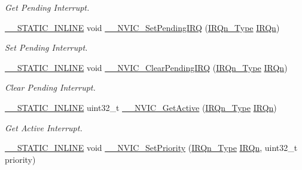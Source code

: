 \begin{DoxyCompactItemize}
\begin{DoxyCompactList}\small\item\em Get Pending Interrupt. \end{DoxyCompactList}\item 
\mbox{\hyperlink{cmsis__iccarm_8h_aba87361bfad2ae52cfe2f40c1a1dbf9c}{\+\_\+\+\_\+\+S\+T\+A\+T\+I\+C\+\_\+\+I\+N\+L\+I\+NE}} void \mbox{\hyperlink{group___c_m_s_i_s___core___n_v_i_c_functions_gaabefdd4b790b9a7308929938c0c1e1ad}{\+\_\+\+\_\+\+N\+V\+I\+C\+\_\+\+Set\+Pending\+I\+RQ}} (\mbox{\hyperlink{group___interrupt__vector__numbers_gac3af4a32370fb28c4ade8bf2add80251}{I\+R\+Qn\+\_\+\+Type}} \mbox{\hyperlink{group___interrupt__vector__numbers_ga666eb0caeb12ec0e281415592ae89083}{I\+R\+Qn}})
\begin{DoxyCompactList}\small\item\em Set Pending Interrupt. \end{DoxyCompactList}\item 
\mbox{\hyperlink{cmsis__iccarm_8h_aba87361bfad2ae52cfe2f40c1a1dbf9c}{\+\_\+\+\_\+\+S\+T\+A\+T\+I\+C\+\_\+\+I\+N\+L\+I\+NE}} void \mbox{\hyperlink{group___c_m_s_i_s___core___n_v_i_c_functions_ga562a86dbdf14827d0fee8fdafb04d191}{\+\_\+\+\_\+\+N\+V\+I\+C\+\_\+\+Clear\+Pending\+I\+RQ}} (\mbox{\hyperlink{group___interrupt__vector__numbers_gac3af4a32370fb28c4ade8bf2add80251}{I\+R\+Qn\+\_\+\+Type}} \mbox{\hyperlink{group___interrupt__vector__numbers_ga666eb0caeb12ec0e281415592ae89083}{I\+R\+Qn}})
\begin{DoxyCompactList}\small\item\em Clear Pending Interrupt. \end{DoxyCompactList}\item 
\mbox{\hyperlink{cmsis__iccarm_8h_aba87361bfad2ae52cfe2f40c1a1dbf9c}{\+\_\+\+\_\+\+S\+T\+A\+T\+I\+C\+\_\+\+I\+N\+L\+I\+NE}} uint32\+\_\+t \mbox{\hyperlink{group___c_m_s_i_s___core___n_v_i_c_functions_gaa2837003c28c45abf193fe5e8d27f593}{\+\_\+\+\_\+\+N\+V\+I\+C\+\_\+\+Get\+Active}} (\mbox{\hyperlink{group___interrupt__vector__numbers_gac3af4a32370fb28c4ade8bf2add80251}{I\+R\+Qn\+\_\+\+Type}} \mbox{\hyperlink{group___interrupt__vector__numbers_ga666eb0caeb12ec0e281415592ae89083}{I\+R\+Qn}})
\begin{DoxyCompactList}\small\item\em Get Active Interrupt. \end{DoxyCompactList}\item 
\mbox{\hyperlink{cmsis__iccarm_8h_aba87361bfad2ae52cfe2f40c1a1dbf9c}{\+\_\+\+\_\+\+S\+T\+A\+T\+I\+C\+\_\+\+I\+N\+L\+I\+NE}} void \mbox{\hyperlink{group___c_m_s_i_s___core___n_v_i_c_functions_ga505338e23563a9c074910fb14e7d45fd}{\+\_\+\+\_\+\+N\+V\+I\+C\+\_\+\+Set\+Priority}} (\mbox{\hyperlink{group___interrupt__vector__numbers_gac3af4a32370fb28c4ade8bf2add80251}{I\+R\+Qn\+\_\+\+Type}} \mbox{\hyperlink{group___interrupt__vector__numbers_ga666eb0caeb12ec0e281415592ae89083}{I\+R\+Qn}}, uint32\+\_\+t priority)

\end{DoxyCompactItemize}
